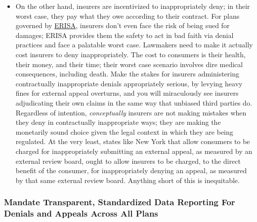\documentclass[12pt, a4paper,twoside,parskip=full]{report}
\theoremstyle{plain} %
\theoremstyle{definition} %
\theoremstyle{remark} %
\numberwithin{equation}{chapter}
\begin{document}
\begin{itemize}
			\item On the other hand, insurers are incentivized to inappropriately deny; in their worst case, they pay what they owe according to their contract. For plans governed by \href{https://www.dol.gov/agencies/ebsa/laws-and-regulations/laws/erisa}{ERISA}, insurers don't even face the risk of being sued for damages; ERISA provides them the safety to act in bad faith via denial practices and face a palatable worst case. Lawmakers need to make it actually cost insurers to deny inappropriately. The cost to consumers is their health, their money, and their time; their worst case scenario involves dire medical consequences, including death. Make the stakes for insurers administering contractually inappropriate denials appropriately serious, by levying heavy fines for external appeal overturns, and you will miraculously see insurers adjudicating their own claims in the same way that unbiased third parties do. Regardless of intention, \emph{conceptually} insurers are not making mistakes when they deny in contractually inappropriate ways; they are making the monetarily sound choice given the legal context in which they are being regulated. At the very least, states like New York that allow consumers to be charged for inappropriately submitting an external appeal, as measured by an external review board, ought to allow insurers to be charged, to the direct benefit of the consumer, for inappropriately denying an appeal, as measured by that same external review board. Anything short of this is inequitable.
		\end{itemize}
		
		\subsubsection{Mandate Transparent, Standardized Data Reporting For Denials and Appeals Across All Plans}
		
\end{document}
